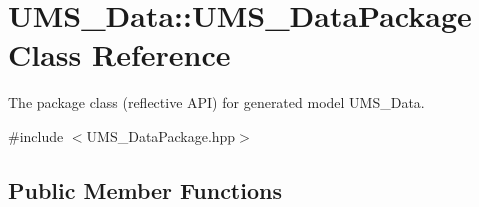 \hypertarget{classUMS__Data_1_1UMS__DataPackage}{
\section{UMS\_\-Data::UMS\_\-DataPackage Class Reference}
\label{classUMS__Data_1_1UMS__DataPackage}
}


The package class (reflective API) for generated model UMS\_\-Data.  




{\ttfamily \#include $<$UMS\_\-DataPackage.hpp$>$}

\subsection*{Public Member Functions}

